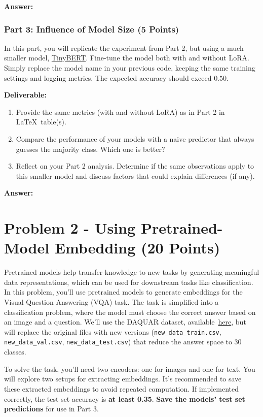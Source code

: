 \documentclass[11pt, oneside]{article}   	%
\begin{document}
\textbf{Answer:} \\


\subsubsection*{Part 3: Influence of Model Size (5 Points)}
In this part, you will replicate the experiment from Part 2, but using a much smaller model, \href{https://huggingface.co/huawei-noah/TinyBERT_General_4L_312D}{TinyBERT}. 
Fine-tune the model both with and without LoRA. Simply replace the model name in your previous code, keeping the same training settings and logging metrics. The expected accuracy should exceed $0.50$.

\textbf{Deliverable:}
\begin{enumerate}
    \item Provide the same metrics (with and without LoRA) as in Part 2 in \LaTeX~table(s).
    \item Compare the performance of your models with a naive predictor that always guesses the majority class. Which one is better?
    \item Reflect on your Part 2 analysis. Determine if the same observations apply to this smaller model and discuss factors that could explain differences (if any).
\end{enumerate}

\textbf{Answer:} \\




\section*{Problem 2 - Using Pretrained-Model Embedding (20 Points)}
Pretrained models help transfer knowledge to new tasks by generating meaningful data representations, which can be used for downstream tasks like classification.
In this problem, you'll use pretrained models to generate embeddings for the Visual Question Answering (VQA) task. The task is simplified into a classification problem, where the model must choose the correct answer based on an image and a question. We'll use the DAQUAR dataset, available~\href{https://www.kaggle.com/datasets/tezansahu/processed-daquar-dataset}{here}, but will replace the original files with new versions (\texttt{new\_data\_train.csv}, \texttt{new\_data\_val.csv}, \texttt{new\_data\_test.csv}) that reduce the answer space to 30 classes.

To solve the task, you’ll need two encoders: one for images and one for text. You will explore two setups for extracting embeddings. It's recommended to save these extracted embeddings to avoid repeated computation. If implemented correctly, the test set accuracy is \textbf{at least 0.35}. \textbf{Save the models' test set predictions} for use in Part 3.
\end{document}
